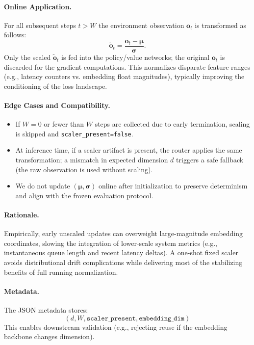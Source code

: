 \paragraph{Online Application.}
For all subsequent steps $t > W$ the environment observation $\mathbf{o}_t$ is transformed as follows:
\[
\tilde{\mathbf{o}}_t = \frac{\mathbf{o}_t - \boldsymbol{\mu}}{\boldsymbol{\sigma}}.
\]
Only the scaled $\tilde{\mathbf{o}}_t$ is fed into the policy/value networks; the original $\mathbf{o}_t$ is discarded for the gradient computations. This normalizes disparate feature ranges (e.g., latency counters vs. embedding float magnitudes), typically improving the conditioning of the loss landscape.

\paragraph{Edge Cases and Compatibility.}
\begin{itemize}
\item If $W = 0$ or fewer than $W$ steps are collected due to early termination, scaling is skipped and \texttt{scaler\_present=false}.
\item At inference time, if a scaler artifact is present, the router applies the same transformation; a mismatch in expected dimension $d$ triggers a safe fallback (the raw observation is used without scaling).
\item We do not update $(\boldsymbol{\mu}, \boldsymbol{\sigma})$ online after initialization to preserve determinism and align with the frozen evaluation protocol.
\end{itemize}

\paragraph{Rationale.}
Empirically, early unscaled updates can overweight large-magnitude embedding coordinates, slowing the integration of lower-scale system metrics (e.g., instantaneous queue length and recent latency deltas). A one-shot fixed scaler avoids distributional drift complications while delivering most of the stabilizing benefits of full running normalization.

\paragraph{Metadata.}
The JSON metadata stores:
\[
(d, W, \texttt{scaler\_present}, \texttt{embedding\_dim})
\]
This enables downstream validation (e.g., rejecting reuse if the embedding backbone changes dimension).
